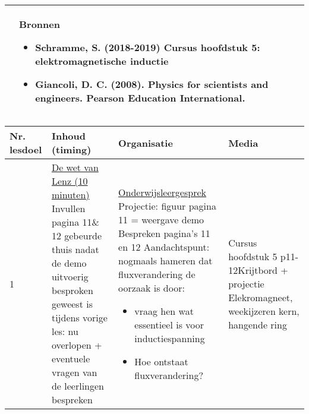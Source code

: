 \begin{landscape}
\begin{tabularx}{1.56\textwidth}{|p{}|X|}
		\\ \cline{2-2}
		  & \textbf{Bronnen}\begin{itemize}
		  	\item Schramme, S. (2018-2019) Cursus hoofdstuk 5: elektromagnetische inductie
		  	\item Giancoli, D. C. (2008). Physics for scientists and engineers. Pearson Education International.
		  \end{itemize}\\ \hline
	\end{tabularx}


\newpage
	


\begin{tabularx}{1.56\textwidth}{|p{1.5cm}|p{8cm}|X|p{4cm}|}
	\hline
	\textbf{Nr. lesdoel } & \textbf{Inhoud (timing)}  & \textbf{Organisatie } & \textbf{Media } \\ \hline
	1\newline\newline 2&\underline{De wet van Lenz (10 minuten)}\newline
	Invullen pagina 11\& 12 gebeurde thuis nadat de demo uitvoerig besproken geweest is tijdens vorige les: nu overlopen + eventuele vragen van de leerlingen bespreken
	&  \underline{Onderwijsleergesprek}\newline 
	Projectie: figuur pagina 11 = weergave demo\newline
	Bespreken pagina's 11 en 12\newline
	Aandachtspunt: nogmaals hameren dat fluxverandering de oorzaak is door:
	\begin{itemize}
		\item vraag hen wat essentieel is voor inductiespanning
		\item Hoe ontstaat fluxverandering?
	\end{itemize}
	&   Cursus hoofdstuk 5 p11-12\newline\newline Krijtbord + projectie \newline\newline Elekromagneet, weekijzeren kern, hangende ring
	\\ \hline
\end{tabularx}\vspace{5mm}


\end{landscape}

